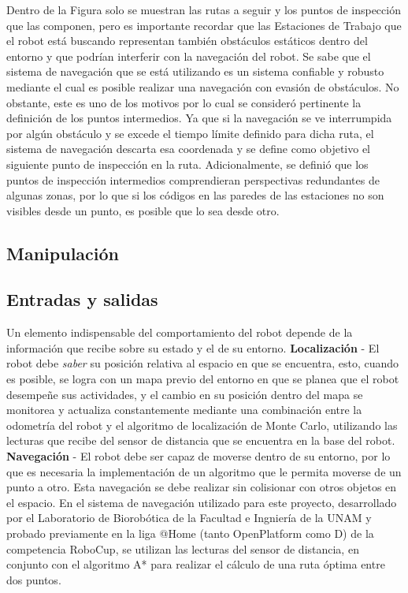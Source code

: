 Dentro de la Figura solo se muestran las rutas a seguir y los puntos de inspección que las componen, pero es importante recordar que las Estaciones de Trabajo que el robot está buscando representan también obstáculos estáticos dentro del entorno y que podrían interferir con la navegación del robot. Se sabe que el sistema de navegación que se está utilizando es un sistema confiable y robusto mediante el cual es posible realizar una navegación con evasión de obstáculos. 
No obstante, este es uno de los motivos por lo cual se consideró pertinente la definición de los puntos intermedios. Ya que si la navegación se ve interrumpida por  algún obstáculo y se excede el tiempo límite definido para dicha ruta, el sistema de navegación descarta esa coordenada y se define como objetivo el siguiente punto de inspección en la ruta. Adicionalmente, se definió que los puntos de inspección intermedios comprendieran perspectivas redundantes de algunas zonas, por lo que si los códigos en las paredes de las estaciones no son visibles desde un punto, es posible que lo sea desde otro.

\subsection{Manipulación}


\subsection{Entradas y salidas}
Un elemento indispensable del comportamiento del robot depende de la información que recibe sobre su estado y el de su entorno.
\textbf{Localización} - El robot debe \textit{saber} su posición relativa al espacio en que se encuentra, esto, cuando es posible, se logra con un mapa previo del entorno en que se planea que el robot desempeñe sus actividades, y el cambio en su posición dentro del mapa se monitorea y actualiza constantemente mediante una combinación entre la odometría del robot y el algoritmo de localización de Monte Carlo, utilizando las lecturas que recibe del sensor de distancia que se encuentra en la  base del robot.
\textbf{Navegación} - El robot debe ser capaz de moverse dentro de su entorno, por lo que es necesaria la implementación de un algoritmo que le permita moverse de un punto a otro. Esta navegación se debe realizar sin colisionar con otros objetos en el espacio. En el sistema de navegación utilizado para este proyecto, desarrollado por el Laboratorio de Biorobótica de la Facultad e Ingniería de la UNAM y probado previamente en la liga @Home (tanto OpenPlatform como D) de la competencia RoboCup, se utilizan las lecturas del sensor de distancia, en conjunto con el algoritmo A* para realizar el cálculo de una ruta óptima entre dos puntos. 

